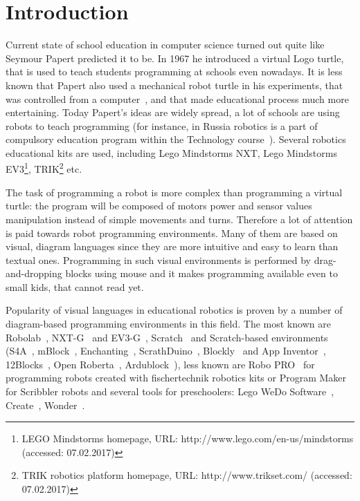 \documentclass[conference]{IEEEtran}
\begin{document}
\section{Introduction}
\label{chapter:intro}
Current state of school education in computer science turned out quite like Seymour Papert predicted it to be. In 1967 he introduced a virtual Logo turtle, that is used to teach students programming at schools even nowadays. It is less known that Papert also used a mechanical robot turtle in his experiments, that was controlled from a computer~\cite{papert1980mindstorms}, and that made educational process much more entertaining. Today Papert's ideas are widely spread, a lot of schools are using robots to teach programming (for instance, in Russia robotics is a part of compulsory education program within the Technology course~\cite{черёмухин2014внедрение,лучин2016внедрение}). Several robotics educational kits are used, including Lego Mindstorms NXT, Lego Mindstorms EV3\footnote{LEGO Mindstorms homepage, URL: http://www.lego.com/en-us/mindstorms (accessed: 07.02.2017)}, 
TRIK\footnote{TRIK robotics platform homepage, URL: http://www.trikset.com/ (accessed: 07.02.2017)} etc.

The task of programming a robot is more complex than programming a virtual turtle: the program will be composed of motors power and sensor values manipulation instead of simple movements and turns. Therefore a lot of attention is paid towards robot programming environments. Many of them are based on visual, diagram languages since they are more intuitive and easy to learn than textual ones. Programming in such visual environments is performed by drag-and-dropping blocks using mouse and it makes programming available even to small kids, that cannot read yet. 

Popularity of visual languages in educational robotics is proven by a number of diagram-based programming environments in this field. The most known are Robolab~\cite{erwin2000lego}, NXT-G~\cite{kelly2010lego} and EV3-G~\cite{valk2014lego}, Scratch~\cite{resnick2009scratch} and Scratch-based environments (S4A~\cite{s4a}, mBlock~\cite{mblock}, Enchanting~\cite{enchanting}, ScrathDuino~\cite{scratchduino}, Blockly~\cite{blockly} and App Inventor~\cite{wolber2011app}, 12Blocks~\cite{12blocks}, Open Roberta~\cite{jost2014graphical}, Ardublock~\cite{ardublock}), less known are Robo PRO~\cite{chang2006incorporating} for programming robots created with fischertechnik robotics kits or Program Maker for Scribbler robots and several tools for preschoolers: Lego WeDo Software~\cite{mayerova2012pilot}, Create~\cite{cross2013visual}, Wonder~\cite{wonder}. 
\end{document}

